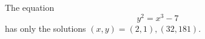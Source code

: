 \begin{proposition}\label{eq:083}
    The equation
\[
    y^2=x^3-7
\]
    has only the solutions $(x,y)=(2,1),(32,181)$.
\end{proposition}
